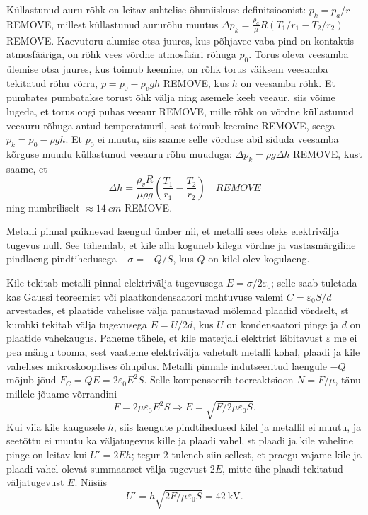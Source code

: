 \documentclass[10pt]{article}
\newcommand{\p}[1]{REMOVE}
\begin{document}
Küllastunud auru rõhk on leitav suhtelise õhuniiskuse definitsioonist: $p_k=p_a/r$ \p{1}, millest küllastunud aururõhu muutus $\Delta p_k=\frac {\rho_a}\mu R(T_1/r_1-T_2/r_2)$ \p{1}. Kaevutoru alumise otsa juures, kus põhjavee vaba pind on kontaktis atmosfääriga, on rõhk vees võrdne atmosfääri rõhuga $p_0$. Torus oleva veesamba ülemise otsa juures, kus toimub keemine, on rõhk torus väiksem veesamba tekitatud rõhu võrra, $p=p_0-\rho_v gh$ \p{1}, kus $h$ on veesamba rõhk. Et pumbates pumbatakse torust õhk välja ning asemele keeb veeaur, siis võime lugeda, et torus ongi puhas veeaur \p{2}, mille rõhk on võrdne küllastunud veeauru rõhuga antud temperatuuril, sest toimub keemine \p{2}, seega $p_k=p_0-\rho gh$. Et $p_0$ ei muutu, siis saame selle võrduse abil siduda veesamba kõrguse muudu küllastunud veeauru rõhu muuduga: $\Delta p_k=\rho g\Delta h$ \p{1}, kust saame, et
$$\Delta h=\frac {\rho_vR}{\mu\rho g}  \left(\frac{T_1}{r_1}-\frac{T_2}{r_2}\right)\quad\p{1}$$
ning numbriliselt $\approx \SI{14}{cm}$ \p{1}.
\probend
\bigskip


\solu
\par
Metalli pinnal paiknevad laengud ümber nii, et metalli sees oleks elektrivälja tugevus null. See tähendab, et kile alla koguneb kilega võrdne ja vastasmärgiline pindlaeng pindtihedusega $-\sigma=-Q/S$, kus $Q$ on kilel olev kogulaeng.

Kile tekitab metalli pinnal elektrivälja tugevusega $E=\sigma/2\varepsilon_0$; selle saab tuletada kas Gaussi teoreemist või plaatkondensaatori mahtuvuse valemi $C=\varepsilon_0 S/d$ arvestades, et plaatide vahelisse välja panustavad mõlemad plaadid võrdselt, st kumbki tekitab välja tugevusega $E=U/2d$, kus $U$ on kondensaatori pinge ja $d$ on plaatide vahekaugus. Paneme tähele, et kile materjali elektrist läbitavust $\varepsilon$ me ei pea mängu tooma, sest vaatleme elektrivälja vahetult metalli kohal, plaadi ja kile vahelises mikroskoopilises õhupilus. Metalli pinnale indutseeritud laengule $-Q$ mõjub jõud $F_C=QE=2\varepsilon_0E^2S$. Selle kompenseerib toereaktsioon $N=F/\mu$, tänu millele jõuame võrrandini
\[
  F=2\mu\varepsilon_0E^2S\Rightarrow E=\sqrt{F/2\mu\varepsilon_0S}.
\]
Kui viia kile kaugusele $h$, siis laengute pindtihedused kilel ja metallil ei muutu, ja seetõttu ei muutu ka väljatugevus kille ja plaadi vahel, st plaadi ja kile vaheline pinge on leitav kui $U'=2Eh$; tegur 2 tuleneb siin sellest, et praegu vajame kile ja plaadi vahel olevat summaarset välja tugevust $2E$, mitte ühe plaadi tekitatud väljatugevust $E$. Niisiis
\[
  U'=h\sqrt{2F/\mu\varepsilon_0S}=\SI{42}{\kV}.
\]
\probend
\bigskip
\end{document}
